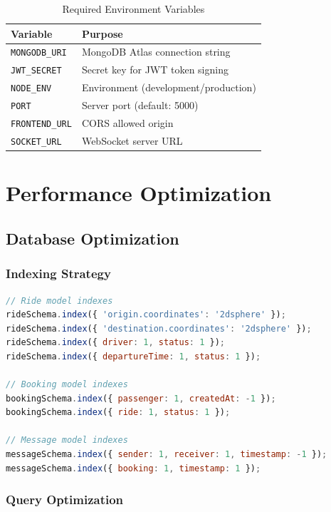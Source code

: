 \documentclass[12pt,a4paper]{article}
\begin{document}
\begin{table}[H]
\centering
\begin{tabular}{|l|p{8cm}|}
\hline
\textbf{Variable} & \textbf{Purpose} \\
\hline
\texttt{MONGODB\_URI} & MongoDB Atlas connection string \\
\texttt{JWT\_SECRET} & Secret key for JWT token signing \\
\texttt{NODE\_ENV} & Environment (development/production) \\
\texttt{PORT} & Server port (default: 5000) \\
\texttt{FRONTEND\_URL} & CORS allowed origin \\
\texttt{SOCKET\_URL} & WebSocket server URL \\
\hline
\end{tabular}
\caption{Required Environment Variables}
\end{table}

\newpage

\section{Performance Optimization}

\subsection{Database Optimization}

\subsubsection{Indexing Strategy}

\begin{lstlisting}[language=JavaScript, caption=Performance Indexes]
// Ride model indexes
rideSchema.index({ 'origin.coordinates': '2dsphere' });
rideSchema.index({ 'destination.coordinates': '2dsphere' });
rideSchema.index({ driver: 1, status: 1 });
rideSchema.index({ departureTime: 1, status: 1 });

// Booking model indexes
bookingSchema.index({ passenger: 1, createdAt: -1 });
bookingSchema.index({ ride: 1, status: 1 });

// Message model indexes
messageSchema.index({ sender: 1, receiver: 1, timestamp: -1 });
messageSchema.index({ booking: 1, timestamp: 1 });
\end{lstlisting}

\subsubsection{Query Optimization}
\end{document}
